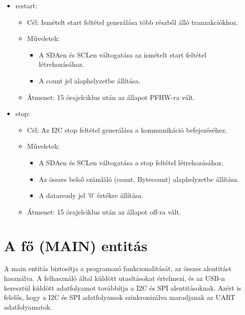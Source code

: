 \documentclass[a4paper,12pt,oneside]{book}
\begin{document}
\begin{itemize}
\begin{itemize}
    \end{itemize}
    \item restart:
    \begin{itemize}
        \item Cél: Ismételt start feltétel generálása több részből álló tranzakciókhoz.
        \item Műveletek:
        \begin{itemize}
            \item A SDAen és SCLen váltogatása az ismételt start feltétel létrehozásához.
            \item A count jel alaphelyzetbe állítása.
        \end{itemize}
        \item Átmenet: 15 órajelciklus után az állapot PFHW-ra vált.
    \end{itemize}
    \item stop:
    \begin{itemize}
        \item Cél: Az I2C stop feltétel generálása a kommunikáció befejezéséhez.
        \item Műveletek:
        \begin{itemize}
            \item A SDAen és SCLen váltogatása a stop feltétel létrehozásához.
            \item Az összes belső számláló (count, Bytecount) alaphelyzetbe állítása.
            \item A dataready jel '0' értékre állítása.
        \end{itemize}
        \item Átmenet: 15 órajelciklus után az állapot off-ra vált.
    \end{itemize}

\end{itemize}
\section{A fő (MAIN) entitás}
A main entitás biztosítja a programozó funkcionalitását, az összes alentitást használva. A felhasználó által küldött utasításokat értelmezi, és az USB-n keresztül küldött adatfolyamot továbbítja a I2C és SPI alentitásoknak. Azért is felelős, hogy a I2C és SPI adatfolyamok szinkronizálva maradjanak az UART adatfolyamatok. 
\end{document}
